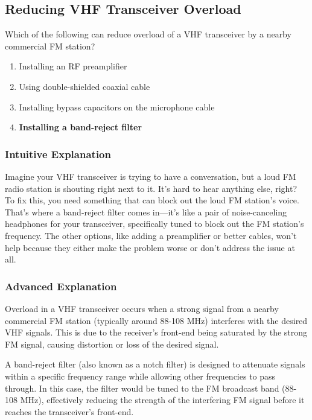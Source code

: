 \subsection{Reducing VHF Transceiver Overload}
\label{T7B07}

\begin{tcolorbox}[colback=gray!10!white,colframe=black!75!black,title=T7B07]
Which of the following can reduce overload of a VHF transceiver by a nearby commercial FM station?
\begin{enumerate}[label=\Alph*)]
    \item Installing an RF preamplifier
    \item Using double-shielded coaxial cable
    \item Installing bypass capacitors on the microphone cable
    \item \textbf{Installing a band-reject filter}
\end{enumerate}
\end{tcolorbox}

\subsubsection*{Intuitive Explanation}
Imagine your VHF transceiver is trying to have a conversation, but a loud FM radio station is shouting right next to it. It’s hard to hear anything else, right? To fix this, you need something that can block out the loud FM station’s voice. That’s where a band-reject filter comes in—it’s like a pair of noise-canceling headphones for your transceiver, specifically tuned to block out the FM station’s frequency. The other options, like adding a preamplifier or better cables, won’t help because they either make the problem worse or don’t address the issue at all.

\subsubsection*{Advanced Explanation}
Overload in a VHF transceiver occurs when a strong signal from a nearby commercial FM station (typically around 88-108 MHz) interferes with the desired VHF signals. This is due to the receiver’s front-end being saturated by the strong FM signal, causing distortion or loss of the desired signal.

A band-reject filter (also known as a notch filter) is designed to attenuate signals within a specific frequency range while allowing other frequencies to pass through. In this case, the filter would be tuned to the FM broadcast band (88-108 MHz), effectively reducing the strength of the interfering FM signal before it reaches the transceiver’s front-end.

